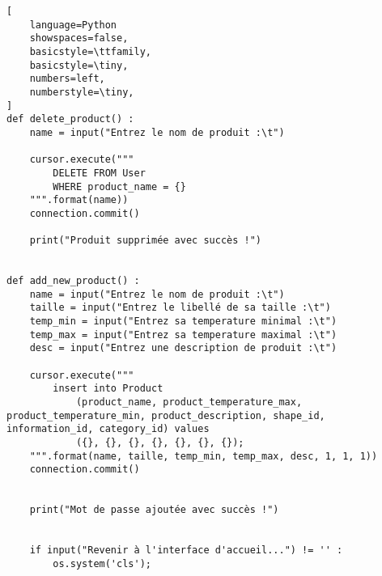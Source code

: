 \begin{lstlisting}[
    language=Python
    showspaces=false,
    basicstyle=\ttfamily,
    basicstyle=\tiny,
    numbers=left,
    numberstyle=\tiny,
]
def delete_product() :
    name = input("Entrez le nom de produit :\t")

    cursor.execute("""
        DELETE FROM User
        WHERE product_name = {}
    """.format(name))
    connection.commit()

    print("Produit supprimée avec succès !")


def add_new_product() :
    name = input("Entrez le nom de produit :\t")
    taille = input("Entrez le libellé de sa taille :\t")
    temp_min = input("Entrez sa temperature minimal :\t")
    temp_max = input("Entrez sa temperature maximal :\t")
    desc = input("Entrez une description de produit :\t")

    cursor.execute("""
        insert into Product
            (product_name, product_temperature_max, product_temperature_min, product_description, shape_id, information_id, category_id) values
            ({}, {}, {}, {}, {}, {}, {});
    """.format(name, taille, temp_min, temp_max, desc, 1, 1, 1))
    connection.commit()


    print("Mot de passe ajoutée avec succès !")


    if input("Revenir à l'interface d'accueil...") != '' :
        os.system('cls');

\end{lstlisting}
